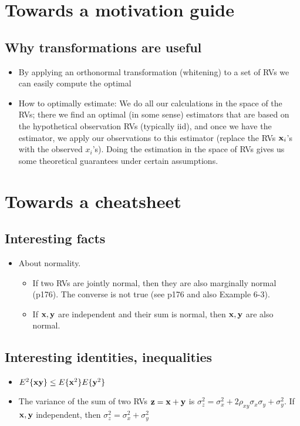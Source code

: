 \documentclass[a4paper, oneside]{book}
\begin{document}
\chapter*{Towards a motivation guide}
\section{Why transformations are useful}
\begin{itemize}
\item By applying an orthonormal transformation (\aka whitening) to a set of RVs we can easily compute the optimal 
\item How to optimally estimate: We do all our calculations in the space of the RVs; there we find an optimal (in some sense) estimators that are based on the hypothetical observation RVs (typically iid), and once we have the estimator, we apply our observations to this estimator (\ie replace the RVs $\mathbf{x}_i$'s with the observed $x_i$'s). Doing the estimation in the space of RVs gives us some theoretical guarantees under certain assumptions.
\end{itemize}

\chapter*{Towards a cheatsheet}

\section{Interesting facts}

\begin{itemize}
\item About normality.
	\begin{itemize}
	\item If two RVs are jointly normal, then they are also marginally normal (p176). The converse is not true (see p176 and also Example 6-3).
	\item If $\mathbf{x,y}$ are independent and their sum is normal, then $\mathbf{x,y}$ are also normal.
	
	\end{itemize}
\end{itemize}

\section{Interesting identities, inequalities}
\begin{itemize}
\item $E^2\{\mathbf{xy}\} \le E\{\mathbf x^2\} E\{\mathbf y^2\}$
\item The variance of the sum of two RVs $\mathbf{z = x+y }$ is $\sigma_z^2 = \sigma_x^2 + 2\rho_{xy} \sigma_x\sigma_y+ \sigma_y^2$. If $\mathbf{x,y}$ independent, then $\sigma_z^2 = \sigma_x^2 + \sigma_y^2$
\end{itemize}
\end{document}
